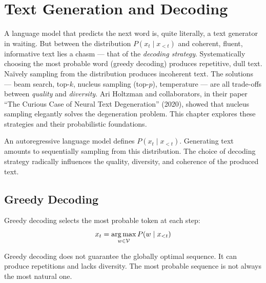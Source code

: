 \chapter{Text Generation and Decoding}
\label{ch:generation}

A language model that predicts the next word is, quite literally, a text generator in waiting. But between the distribution $P(x_t \mid x_{<t})$ and coherent, fluent, informative text lies a chasm --- that of the \emph{decoding strategy}. Systematically choosing the most probable word (greedy decoding) produces repetitive, dull text. Na\"ively sampling from the distribution produces incoherent text. The solutions --- beam search, top-$k$, nucleus sampling (top-$p$), temperature --- are all trade-offs between \emph{quality} and \emph{diversity}. Ari Holtzman and collaborators, in their paper ``The Curious Case of Neural Text Degeneration'' (2020), showed that nucleus sampling elegantly solves the degeneration problem. This chapter explores these strategies and their probabilistic foundations.

\begin{intuition}[title=\textbf{From language model to generator}]
An autoregressive language model defines $P(x_t \mid x_{<t})$. Generating text
amounts to sequentially sampling from this distribution. The choice of decoding
strategy radically influences the quality, diversity, and coherence of the
produced text.
\end{intuition}

\section{Greedy Decoding}
\label{sec:gen:greedy}

\begin{definition}
Greedy decoding selects the most probable token at each step:
\[
x_t = \operatorname*{arg\,max}_{w \in \mathcal{V}} P(w \mid x_{<t})
\]
\end{definition}

\begin{warning}[title=\textbf{Limitations of greedy decoding}]
Greedy decoding does not guarantee the globally optimal sequence. It can produce
repetitions and lacks diversity. The most probable sequence is not always the
most natural one.
\end{warning}

